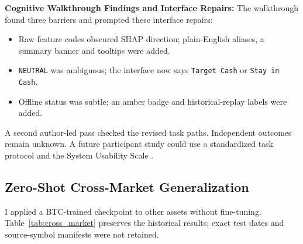 \documentclass[11pt,a4paper]{article}
\begin{document}
\textbf{Cognitive Walkthrough Findings and Interface Repairs:}
The walkthrough found three barriers and prompted these interface repairs:
\begin{itemize}[leftmargin=2em]
    \item Raw feature codes obscured SHAP direction; plain-English aliases, a summary banner and tooltips were added.
    \item \texttt{NEUTRAL} was ambiguous; the interface now says \texttt{Target Cash} or \texttt{Stay in Cash}.
    \item Offline status was subtle; an amber badge and historical-replay labels were added.
\end{itemize}

A second author-led pass checked the revised task paths. Independent outcomes remain unknown. A future participant study could use a standardized task protocol and the System Usability Scale \cite{brooke1996,sauro2016}.

\subsection{Zero-Shot Cross-Market Generalization}
I applied a BTC-trained checkpoint to other assets without fine-tuning. Table~\ref{tab:cross_market} preserves the historical results; exact test dates and source-symbol manifests were not retained.
\end{document}
